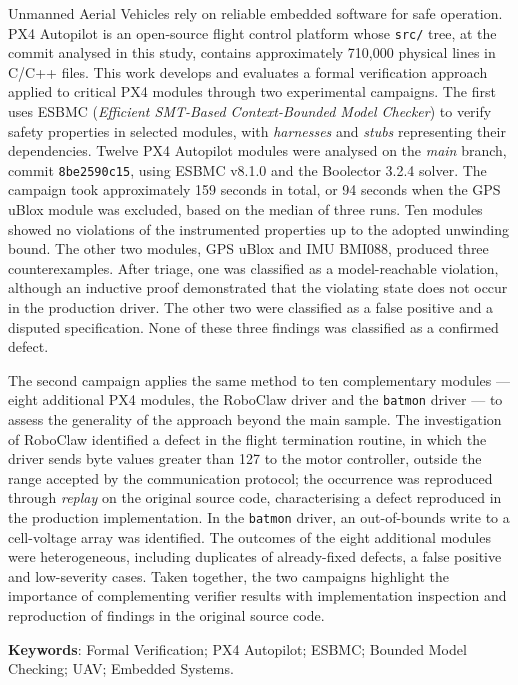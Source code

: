 \begin{foreignabstract}

Unmanned Aerial Vehicles rely on reliable embedded software for safe operation. PX4 Autopilot is an open-source flight control platform whose \texttt{src/} tree, at the commit analysed in this study, contains approximately 710,000 physical lines in C/C++ files. This work develops and evaluates a formal verification approach applied to critical PX4 modules through two experimental campaigns. The first uses ESBMC (\textit{Efficient SMT-Based Context-Bounded Model Checker}) to verify safety properties in selected modules, with \textit{harnesses} and \textit{stubs} representing their dependencies. Twelve PX4 Autopilot modules were analysed on the \textit{main} branch, commit \texttt{8be2590c15}, using ESBMC v8.1.0 and the Boolector 3.2.4 solver. The campaign took approximately 159 seconds in total, or 94 seconds when the GPS uBlox module was excluded, based on the median of three runs. Ten modules showed no violations of the instrumented properties up to the adopted unwinding bound. The other two modules, GPS uBlox and IMU BMI088, produced three counterexamples. After triage, one was classified as a model-reachable violation, although an inductive proof demonstrated that the violating state does not occur in the production driver. The other two were classified as a false positive and a disputed specification. None of these three findings was classified as a confirmed defect.

The second campaign applies the same method to ten complementary modules --- eight additional PX4 modules, the RoboClaw driver and the \texttt{batmon} driver --- to assess the generality of the approach beyond the main sample. The investigation of RoboClaw identified a defect in the flight termination routine, in which the driver sends byte values greater than 127 to the motor controller, outside the range accepted by the communication protocol; the occurrence was reproduced through \textit{replay} on the original source code, characterising a defect reproduced in the production implementation. In the \texttt{batmon} driver, an out-of-bounds write to a cell-voltage array was identified. The outcomes of the eight additional modules were heterogeneous, including duplicates of already-fixed defects, a false positive and low-severity cases. Taken together, the two campaigns highlight the importance of complementing verifier results with implementation inspection and reproduction of findings in the original source code.

\noindent
\textbf{Keywords}: Formal Verification; PX4 Autopilot; ESBMC; Bounded Model Checking; UAV; Embedded Systems.
\end{foreignabstract}

